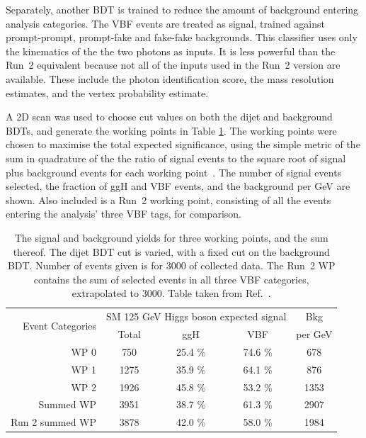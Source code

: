 Separately, another BDT is trained to reduce the amount of background entering analysis categories.
The VBF events are treated as signal, trained against prompt-prompt, 
prompt-fake and fake-fake \Hgg backgrounds.
This classifier uses only the kinematics of the the two photons as inputs. 
It is less powerful than the Run~2 equivalent 
because not all of the inputs used in the Run~2 version are available.
These include the photon identification score, 
the mass resolution estimates, and the vertex probability estimate.

A 2D scan was used to choose cut values on both the dijet and background BDTs, 
and generate the working points in Table \ref{tab:hgcal_yields}.
The working points were chosen to maximise the total expected significance, 
using the simple metric of the sum in quadrature of the 
the ratio of signal events to the square root of signal plus background events
for each working point~\cite{Asymptotic}.
The number of signal events selected, the fraction of ggH and VBF events, 
and the background per GeV are shown.
Also included is a Run~2 working point, 
consisting of all the events entering the analysis' three VBF tags, for comparison.

\begin{table}
  \centering
  \begin{tabular}{ r | c |  c |  c |  c }
  \multirow{2}{*}{Event Categories} &\multicolumn{3}{c|}{SM 125 GeV Higgs boson expected signal} & Bkg \\
    &  Total & ggH & VBF & per GeV \\
  \hline
  WP 0 &            750   &  25.4 \%  &  74.6 \%  &  678  \\
  WP 1 &            1275  &  35.9 \%  &  64.1 \%  &  876  \\
  WP 2 &            1926  &  45.8 \%  &  53.2 \%  &  1353 \\
  Summed WP &       3951  &  38.7 \%  &  61.3 \%  &  2907 \\
  Run 2 summed WP & 3878  &  42.0 \%  &  58.0 \%  &  1984 \\
  \end{tabular}
  \caption[Signal and background yields for a VBF \Hgg analysis with the upgraded CMS detector.]
  {
    The signal and background yields for three working points, and the sum thereof.
    The dijet BDT cut is varied, with a fixed cut on the background BDT.
    Number of events given is for \SI{3000}{\fbinv} of collected data. 
    The Run~2 WP contains the sum of selected events in all three VBF categories, extrapolated to \SI{3000}{\fbinv}.
    Table taken from Ref.~\cite{HGCAL}.
  }
  \label{tab:hgcal_yields}
\end{table}

